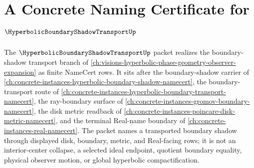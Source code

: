 \chapter{A Concrete Naming Certificate for $\HyperbolicBoundaryShadowTransportUp$}
\label{ch:concrete-instances-hyperbolic-boundary-shadow-transport-namecert}

The $\HyperbolicBoundaryShadowTransportUp$ packet realizes the boundary-shadow
transport branch of
\autoref{ch:visions-hyperbolic-phase-geometry-observer-expansion} as finite
NameCert rows. It sits after the boundary-shadow carrier of
\autoref{ch:concrete-instances-hyperbolic-boundary-shadow-namecert}, the
boundary-transport route of
\autoref{ch:concrete-instances-hyperbolic-boundary-transport-namecert}, the
ray-boundary surface of \autoref{ch:concrete-instances-gromov-boundary-namecert},
the disk metric readback of
\autoref{ch:concrete-instances-poincare-disk-metric-namecert}, and the terminal
Real-name boundary of \autoref{ch:concrete-instances-real-namecert}. The packet
names a transported boundary shadow through displayed disk, boundary, metric,
and Real-facing rows; it is not an interior-center collapse, a selected ideal
endpoint, quotient boundary equality, physical observer motion, or global
hyperbolic compactification.



